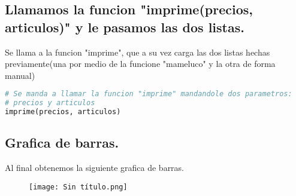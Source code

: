 \documentclass[12pt]{article}
\begin{document}
	\subsection{Llamamos la funcion "imprime(precios, articulos)" y le pasamos las dos listas.}
	Se llama a la funcion "imprime", que a su vez carga las dos listas hechas previamente(una por medio de la funcione "mameluco" y la otra de forma manual)
\begin{lstlisting}[language=Python]
# Se manda a llamar la funcion "imprime" mandandole dos parametros: 
# precios y articulos
imprime(precios, articulos)
\end{lstlisting}	
\subsection{Grafica de barras.}
Al final obtenemos la siguiente grafica de barras.
	\begin{figure}[h!]
	\begin{minipage}[t]{0.72\textwidth}
		\centering
		\texttt{[image: Sin título.png]}
		\label{fig:imagen1}
	\end{minipage}\hfill
	\end{figure}
\end{document}
